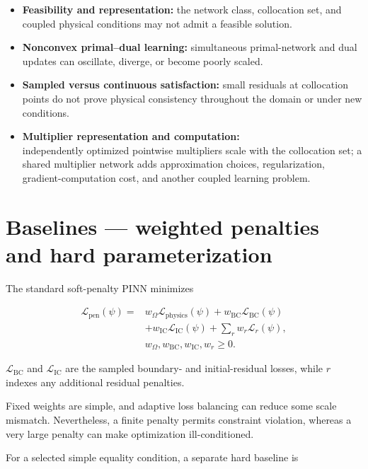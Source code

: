 \documentclass[a4paper]{article}
\begin{document}
\begin{itemize}
  \item \textbf{Feasibility and representation:} the network class, collocation set, and
  coupled physical conditions may not admit a feasible solution.
  \item \textbf{Nonconvex primal--dual learning:} simultaneous primal-network and dual
  updates can oscillate, diverge, or become poorly scaled.
  \item \textbf{Sampled versus continuous satisfaction:} small residuals at collocation
  points do not prove physical consistency throughout the domain or under new
  conditions.
  \item \textbf{Multiplier representation and computation:}\\
  independently optimized
  pointwise multipliers scale with the collocation set; a shared multiplier
  network adds approximation choices, regularization, gradient-computation
  cost, and another coupled learning problem.
\end{itemize}

\section{Baselines --- weighted penalties and hard parameterization}

The standard soft-penalty PINN minimizes

\begin{equation}
\begin{aligned}
\mathcal L_{\mathrm{pen}}(\psi)
={}&
w_\Omega\mathcal L_{\mathrm{physics}}(\psi)
+w_{\mathrm{BC}}\mathcal L_{\mathrm{BC}}(\psi)\\
&+w_{\mathrm{IC}}\mathcal L_{\mathrm{IC}}(\psi)
+\sum_r w_r\mathcal L_r(\psi),\\
&w_\Omega,w_{\mathrm{BC}},w_{\mathrm{IC}},w_r\ge0.
\end{aligned}
\end{equation}

$\mathcal L_{\mathrm{BC}}$ and $\mathcal L_{\mathrm{IC}}$ are the sampled
boundary- and initial-residual losses, while $r$ indexes any additional
residual penalties.

Fixed weights are simple, and adaptive loss balancing can reduce some scale
mismatch. Nevertheless, a finite penalty permits constraint violation,
whereas a very large penalty can make optimization ill-conditioned.

For a selected simple equality condition, a separate hard baseline is
\end{document}
